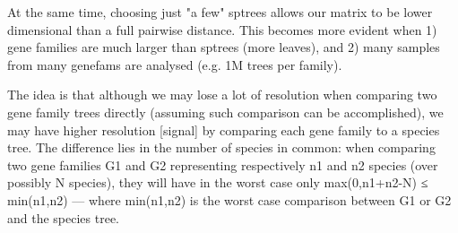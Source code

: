At the same time, choosing just "a few" sptrees allows our matrix to be lower dimensional than a full pairwise distance.
This becomes more evident when 1) gene families are much larger than sptrees (more leaves), and 2) many samples from
many genefams are analysed (e.g. 1M trees per family).

The idea is that although we may lose a lot of resolution when comparing two gene family trees directly (assuming such
comparison can be accomplished), we may have higher resolution [signal] by comparing each gene family to a species tree.
The difference lies in the number of species in common: when comparing two gene families G1 and G2 representing
respectively n1 and n2 species (over possibly N species), they will have in the worst case only max(0,n1+n2-N) ≤
min(n1,n2)  ---  where min(n1,n2) is the worst case comparison between G1 or G2 and the species tree.



